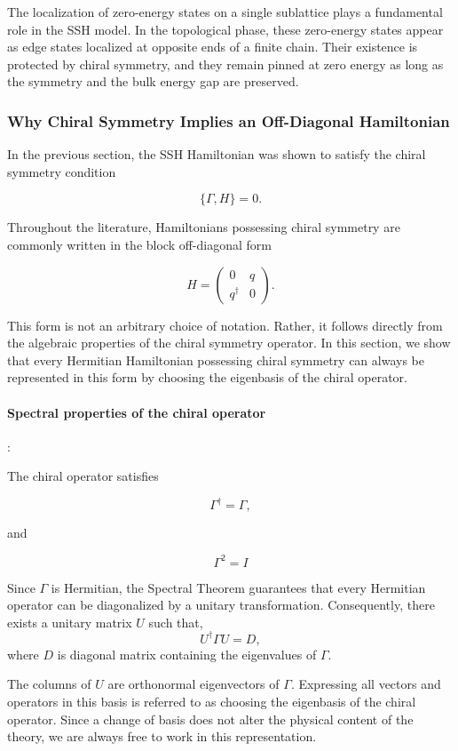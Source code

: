 \documentclass[11pt, a4paper]{article}
\begin{document}
The localization of zero-energy states on a single sublattice plays a fundamental
role in the SSH model. In the topological phase, these zero-energy states appear as
edge states localized at opposite ends of a finite chain. Their existence is protected
by chiral symmetry, and they remain pinned at zero energy as long as the symmetry
and the bulk energy gap are preserved.


\subsubsection{Why Chiral Symmetry Implies an Off-Diagonal Hamiltonian}

In the previous section, the SSH Hamiltonian was shown to satisfy the chiral symmetry condition

\[
    \{\Gamma, H \} = 0.
\]

Throughout the literature, Hamiltonians possessing chiral symmetry are commonly written in the block off-diagonal form

\[
    H= \begin{pmatrix}
        0 & q \\
        q^{\dagger} & 0
    \end{pmatrix}.
\]

This form is not an arbitrary choice of notation. Rather, it follows directly from the algebraic properties of the chiral symmetry operator. In this section, we show that every Hermitian Hamiltonian possessing chiral symmetry can always be represented in this form by choosing the eigenbasis of the chiral operator.

\paragraph{Spectral properties of the chiral operator}:

The chiral operator satisfies

\[
    \Gamma^{\dagger} = \Gamma,
\]

and 

\[
    \Gamma^2 = I
\]

Since $\Gamma$ is Hermitian, the Spectral Theorem guarantees that every Hermitian operator can be diagonalized by a unitary transformation. Consequently, there exists a unitary matrix $U$ such that,
\[  U^{\dagger}\Gamma U = D,\]
where $D$ is diagonal matrix containing the eigenvalues of $\Gamma$.

The columns of $U$ are orthonormal eigenvectors of $\Gamma$. Expressing all vectors and operators in this basis is referred to as choosing the eigenbasis of the chiral operator. Since a change of basis does not alter the physical content of the theory, we are always free to work in this representation.
\end{document}
